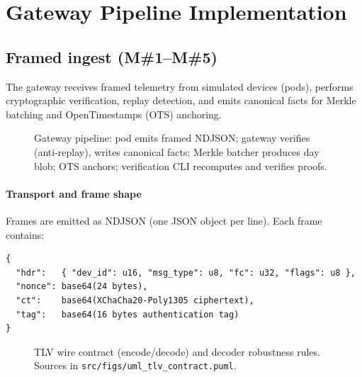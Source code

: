 \section{Gateway Pipeline Implementation}

\subsection{Framed ingest (M\#1--M\#5)}
The gateway receives framed telemetry from simulated devices (pods), performs cryptographic verification, replay detection, and emits canonical facts for Merkle batching and OpenTimestamps (OTS) anchoring.

\begin{figure}[h]
  \centering
  \caption{Gateway pipeline: pod emits framed NDJSON; gateway verifies (anti-replay), writes canonical facts; Merkle batcher produces day blob; OTS anchors; verification CLI recomputes and verifies proofs.}
  \label{fig:gateway-pipeline}
\end{figure}

\paragraph{Transport and frame shape}
Frames are emitted as NDJSON (one JSON object per line).
Each frame contains:
\begin{verbatim}
{
  "hdr":   { "dev_id": u16, "msg_type": u8, "fc": u32, "flags": u8 },
  "nonce": base64(24 bytes),
  "ct":    base64(XChaCha20-Poly1305 ciphertext),
  "tag":   base64(16 bytes authentication tag)
}
\end{verbatim}

\begin{figure}[h]
  \caption{TLV wire contract (encode/decode) and decoder robustness rules. Sources in \texttt{src/figs/uml\_tlv\_contract.puml}.}
  \label{fig:uml-tlv-contract}
\end{figure}


